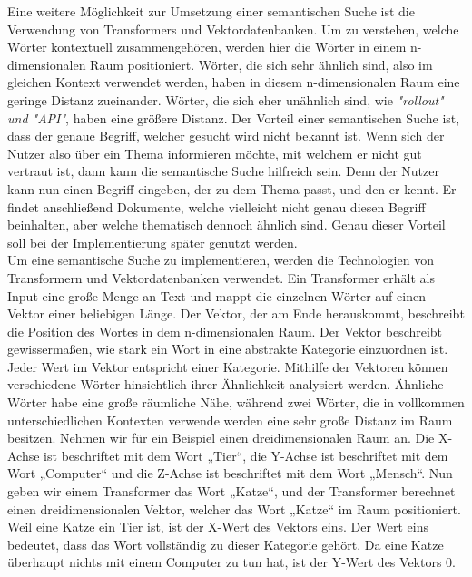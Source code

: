 Eine weitere Möglichkeit zur Umsetzung einer semantischen Suche ist die Verwendung von Transformers und Vektordatenbanken.
Um zu verstehen, welche Wörter kontextuell zusammengehören, werden hier die Wörter in einem n-dimensionalen Raum positioniert.
Wörter, die sich sehr ähnlich sind, also im gleichen Kontext verwendet werden, haben in diesem n-dimensionalen Raum eine geringe Distanz zueinander.
Wörter, die sich eher unähnlich sind, wie \textit{"rollout" und "API"}, haben eine größere Distanz.
Der Vorteil einer semantischen Suche ist, dass der genaue Begriff, welcher gesucht wird nicht bekannt ist.
Wenn sich der Nutzer also über ein Thema informieren möchte, mit welchem er nicht gut vertraut ist, dann kann die semantische Suche hilfreich sein.
Denn der Nutzer kann nun einen Begriff eingeben, der zu dem Thema passt, und den er kennt.
Er findet anschließend Dokumente, welche vielleicht nicht genau diesen Begriff beinhalten, aber welche thematisch dennoch ähnlich sind.
Genau dieser Vorteil soll bei der Implementierung später genutzt werden.\\

Um eine semantische Suche zu implementieren, werden die Technologien von Transformern und Vektordatenbanken verwendet.
Ein Transformer erhält als Input eine große Menge an Text und mappt die einzelnen Wörter auf einen Vektor einer beliebigen Länge.
Der Vektor, der am Ende herauskommt, beschreibt die Position des Wortes in dem n-dimensionalen Raum.
Der Vektor beschreibt gewissermaßen, wie stark ein Wort in eine abstrakte Kategorie einzuordnen ist.
Jeder Wert im Vektor entspricht einer Kategorie.
Mithilfe der Vektoren können verschiedene Wörter hinsichtlich ihrer Ähnlichkeit analysiert werden.
Ähnliche Wörter habe eine große räumliche Nähe, während zwei Wörter, die in vollkommen unterschiedlichen Kontexten verwende werden eine sehr große Distanz im Raum besitzen.
Nehmen wir für ein Beispiel einen dreidimensionalen Raum an.
Die X-Achse ist beschriftet mit dem Wort „Tier“, die Y-Achse ist beschriftet mit dem Wort „Computer“ und die Z-Achse ist beschriftet mit dem Wort „Mensch“.
Nun geben wir einem Transformer das Wort „Katze“, und der Transformer berechnet einen dreidimensionalen Vektor, welcher das Wort „Katze“ im Raum positioniert.
Weil eine Katze ein Tier ist, ist der X-Wert des Vektors eins.
Der Wert eins bedeutet, dass das Wort vollständig zu dieser Kategorie gehört.
Da eine Katze überhaupt nichts mit einem Computer zu tun hat, ist der Y-Wert des Vektors 0.\\

